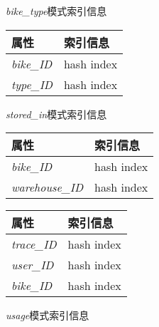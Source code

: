 \begin{figure}[!htp]
    \begin{minipage}{0.3\textwidth}
      \centering
      \caption{\textit{bike\_type}模式索引信息}
      \label{tab:indexbiketype}
      \begin{tabular}{ll}\toprule
        属性&索引信息\\\midrule
       \textit{bike\_ID}&hash index\\
       \textit{type\_ID}&hash index\\
       \bottomrule
      \end{tabular}
    \end{minipage}\hfill
    \begin{minipage}{0.3\textwidth}
      \centering
      \caption{\textit{stored\_in}模式索引信息}
      \label{tab:indexstoredin}
      \begin{tabular}{ll}\toprule
        属性&索引信息\\\midrule
       \textit{bike\_ID}&hash index\\
       \textit{warehouse\_ID}&hash index\\
       \bottomrule
      \end{tabular}
    \end{minipage}\hfill
    \begin{minipage}{0.3\textwidth}
      \centering
      \caption{\textit{usage}模式索引信息}
      \label{tab:indexusage}
      \begin{tabular}{ll}\toprule
        属性&索引信息\\\midrule
       \textit{trace\_ID}&hash index\\
       \textit{user\_ID}&hash index\\
       \textit{bike\_ID}&hash index\\
       \bottomrule
      \end{tabular}
    \end{minipage}\hfill
  \end{figure}
